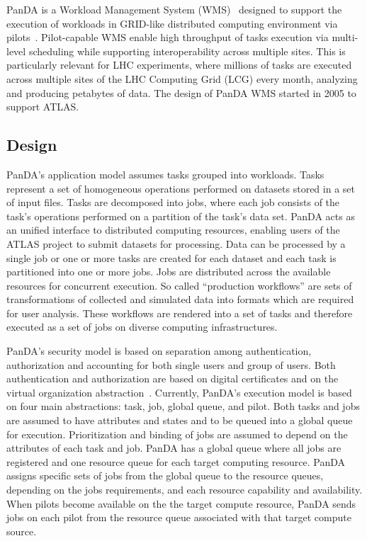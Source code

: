 PanDA is a Workload Management System (WMS)~\cite{marco2009glite} designed to
support the execution of workloads in GRID-like distributed computing
environment  via pilots~\cite{turilli2017comprehensive}.  Pilot-capable WMS
enable high throughput of tasks execution via multi-level scheduling while
supporting interoperability across multiple sites. This is particularly
relevant for LHC experiments, where millions of tasks are executed across
multiple sites of the LHC Computing Grid (LCG) every month, analyzing and
producing petabytes of data. The design of PanDA WMS started in 2005 to
support ATLAS.

\subsection{Design}
\label{subsec:design}

PanDA's application model assumes tasks grouped into workloads. Tasks
represent a set of homogeneous operations performed on datasets stored in a
set of input files. Tasks are decomposed into jobs, where each job consists
of the task's operations performed on a partition of the task's data set.
PanDA acts as an unified interface to distributed computing resources,
enabling users of the ATLAS project to submit datasets for processing. Data
can be processed by a single job or one or more tasks are created for each
dataset and each task is partitioned into one or more jobs. Jobs are
distributed across the available resources for concurrent execution. So
called ``production workflows'' are sets of transformations of collected and
simulated data into formats which are required for user analysis. These
workflows are rendered into a set of tasks and therefore executed as a set of
jobs on diverse computing infrastructures.

PanDA's security model is based on separation among authentication,
authorization and accounting for both single users and group of users. Both
authentication and authorization are based on digital certificates and on the
virtual organization abstraction~\cite{foster2001anatomy}. Currently, PanDA's
execution model is based on four main abstractions: task, job, global queue,
and pilot. Both tasks and jobs are assumed to have attributes and states and
to be queued into a global queue for execution. Prioritization and binding of
jobs are assumed to depend on the attributes of each task and  job. PanDA has
a global queue where all jobs are registered and one resource queue for each
target  computing resource. PanDA assigns specific sets of jobs from the
global queue to the resource queues, depending on the jobs requirements, and
each resource capability and availability. When pilots become available on
the the target compute resource, PanDA  sends jobs on each pilot from the
resource  queue associated with that target compute source.

